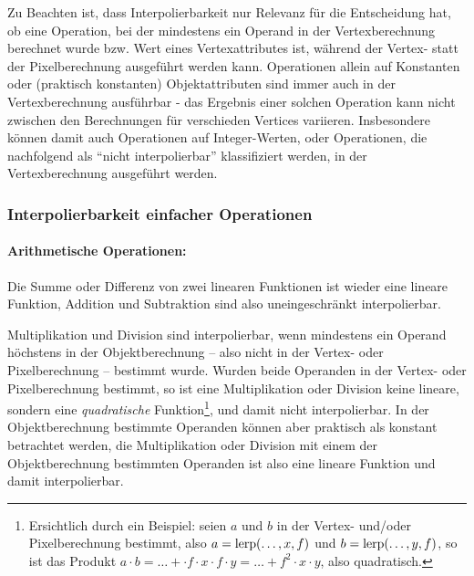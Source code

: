 \documentclass[twoside,a4paper,fleqn,12pt]{book}
\begin{document}
Zu Beachten ist, dass Interpolierbarkeit nur Relevanz für die Entscheidung hat, ob eine Operation, bei der mindestens ein Operand in der Vertexberechnung
berechnet wurde bzw. Wert eines Vertexattributes ist, während der Vertex- statt der Pixelberechnung ausgeführt werden kann.
Operationen allein auf Konstanten oder (praktisch konstanten) Objektattributen sind immer auch in der Vertexberechnung ausführbar - das Ergebnis
einer solchen Operation kann nicht zwischen den Berechnungen für verschieden Vertices variieren. Insbesondere können damit
auch Operationen auf Integer-Werten, oder Operationen, die nachfolgend als "`nicht interpolierbar"' klassifiziert werden,
in der Vertexberechnung ausgeführt werden.



\subsubsection{Interpolierbarkeit einfacher Operationen}

\paragraph{Arithmetische Operationen:} Die Summe oder Differenz von zwei linearen Funktionen
ist wieder eine lineare Funktion, Addition und Subtraktion sind also uneingeschränkt interpolierbar.

Multiplikation und Division sind interpolierbar, wenn mindestens ein Operand höchstens in der Objektberechnung --
also nicht in der Vertex- oder Pixelberechnung -- bestimmt wurde.
Wurden beide Operanden in der Vertex- oder Pixelberechnung bestimmt, so ist eine Multiplikation oder Division keine lineare,
sondern eine \emph{quadratische} Funktion\footnote{Ersichtlich durch ein Beispiel: seien $a$ und $b$ in der Vertex- und/oder Pixelberechnung bestimmt,
also $a = \mathrm{lerp}(\dots, x, f)$ und $b = \mathrm{lerp}(\dots, y, f)$, so ist das Produkt $a \cdot b = \dots + \cdot f \cdot x \cdot f \cdot y = \dots  + f^2 \cdot x \cdot y$, also quadratisch.}, 
und damit nicht interpolierbar. In der Objektberechnung bestimmte Operanden können aber praktisch als
konstant betrachtet werden, die Multiplikation oder Division mit einem der Objektberechnung bestimmten 
Operanden ist also eine lineare Funktion und damit interpolierbar.
\end{document}
